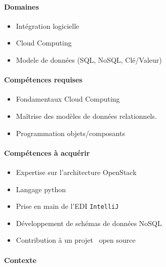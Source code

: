 \documentclass[a4paper,11pt]{article}
\begin{document}
\begin{note}


\paragraph*{Domaines}

\begin{itemize}
 \item Intégration logicielle
 \item Cloud Computing
 \item Modele de données (SQL, NoSQL, Clé/Valeur)
\end{itemize}

\paragraph*{Compétences requises}

\begin{itemize}
 \item Fondamentaux Cloud Computing
 \item Maîtrise des modèles de données relationnels.
 \item Programmation objets/composants
\end{itemize}

\paragraph*{Compétences à acquérir}

\begin{itemize}
 \item Expertise sur l'architecture OpenStack
 \item Langage python
 \item Prise en main de l'EDI \texttt{IntelliJ}
 \item Développement de schémas de données NoSQL
 \item Contribution à un projet \og~open source~\fg
\end{itemize}

\paragraph*{Contexte\\}


\end{note}
\end{document}
